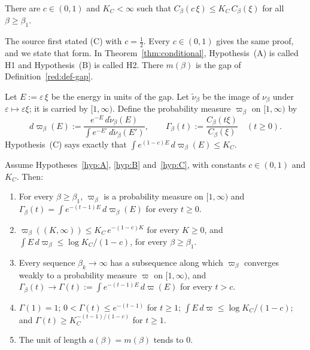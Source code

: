 \begin{hypothesis}\label{hyp:C}
There are $c\in(0,1)$ and $K_C<\infty$ such that $C_\beta(c\,\xi)\le K_C\,C_\beta(\xi)$ for all $\beta\ge\beta_1$.
\end{hypothesis}

The source first stated (C) with $c=\tfrac12$. Every $c\in(0,1)$ gives the same proof, and we state that form. In Theorem~\ref{thm:conditional}, Hypothesis~(A) is called H1 and Hypothesis~(B) is called H2. There $m(\beta)$ is the gap of Definition~\ref{red:def-gap}.

Let $E:=\varepsilon\,\xi$ be the energy in units of the gap. Let $\tilde\nu_\beta$ be the image of $\nu_\beta$ under $\varepsilon\mapsto\varepsilon\xi$; it is carried by $[1,\infty)$. Define the probability measure $\varpi_\beta$ on $[1,\infty)$ by
\begin{equation}\label{red:mu}
  d\varpi_\beta(E):=\frac{e^{-E}\,d\tilde\nu_\beta(E)}{\int e^{-E'}\,d\tilde\nu_\beta(E')},
  \qquad
  \Gamma_\beta(t):=\frac{C_\beta(t\xi)}{C_\beta(\xi)}\quad(t\ge0).
\end{equation}
Hypothesis~(C) says exactly that $\int e^{(1-c)E}\,d\varpi_\beta(E)\le K_C$.

\begin{theorem}[Theorem R$'$]\label{thm:reduction}
Assume Hypotheses~\ref{hyp:A}, \ref{hyp:B} and~\ref{hyp:C}, with constants $c\in(0,1)$ and $K_C$. Then:
\begin{enumerate}
\item[(R1)] For every $\beta\ge\beta_1$, $\varpi_\beta$ is a probability measure on $[1,\infty)$ and $\Gamma_\beta(t)=\int e^{-(t-1)E}\,d\varpi_\beta(E)$ for every $t\ge0$.
\item[(R2)] $\varpi_\beta((K,\infty))\le K_C\,e^{-(1-c)K}$ for every $K\ge0$, and $\int E\,d\varpi_\beta\le \log K_C/(1-c)$, for every $\beta\ge\beta_1$.
\item[(R3)] Every sequence $\beta_k\to\infty$ has a subsequence along which $\varpi_{\beta}$ converges weakly to a probability measure $\varpi$ on $[1,\infty)$, and $\Gamma_\beta(t)\to \Gamma(t):=\int e^{-(t-1)E}\,d\varpi(E)$ for every $t>c$.
\item[(R4)] $\Gamma(1)=1$; $0<\Gamma(t)\le e^{-(t-1)}$ for $t\ge1$; $\int E\,d\varpi\le\log K_C/(1-c)$; and $\Gamma(t)\ge K_C^{-(t-1)/(1-c)}$ for $t\ge1$.
\item[(R5)] The unit of length $a(\beta)=m(\beta)$ tends to $0$.
\end{enumerate}
\end{theorem}


